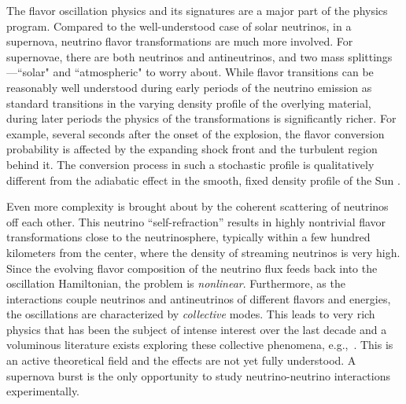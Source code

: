 The flavor oscillation physics and its signatures are a major part of
the physics program. Compared to the well-understood case of solar
neutrinos, in a supernova, neutrino flavor transformations are much
more involved. For supernovae, there are both neutrinos and antineutrinos, and
two mass splittings---``solar" and ``atmospheric" to worry about.
While flavor transitions can be reasonably well understood during 
early periods of the neutrino emission as standard  
transitions in the varying density profile of the overlying material, during
later periods the physics of the transformations is significantly richer.
For example, several seconds after the onset of the explosion, the
flavor conversion probability is affected by the expanding shock front
and the turbulent region behind it. The conversion process in such a
stochastic profile is qualitatively different from the adiabatic 
effect in the smooth, fixed density profile of the Sun . 

Even more complexity is brought about by the coherent scattering of neutrinos off each other. This neutrino ``self-refraction'' 
 results in highly nontrivial flavor transformations close to the neutrinosphere, typically within a few hundred kilometers from the center, where the density of streaming neutrinos is very high. Since the evolving flavor composition of the neutrino flux feeds back into the oscillation Hamiltonian, the problem is \emph{nonlinear}. Furthermore, as the interactions couple neutrinos and antineutrinos of different flavors and energies, the oscillations are characterized by \emph{collective} modes.    This leads to very rich physics that has been the subject of intense interest over the last decade and a voluminous literature exists exploring these collective phenomena,
e.g.,~\cite{Duan:2005cp,Fogli:2007bk,Raffelt:2007cb,Raffelt:2007xt,EstebanPretel:2008ni,Duan:2009cd,Dasgupta:2009mg,Duan:2010bg,Duan:2010bf,Wu:2014kaa}.  This is an active theoretical field and the effects are not yet fully understood. A supernova burst is the only opportunity to study neutrino-neutrino interactions experimentally.


